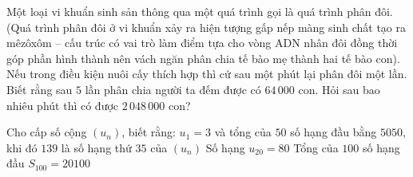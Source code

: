 \begin{ex}%
    Một loại vi khuẩn sinh sản thông qua một quá trình gọi là quá trình phân đôi. (Quá trình phân đôi ở vi khuẩn xảy ra hiện tượng gấp nếp màng sinh chất tạo ra mêzôxôm – cấu trúc có vai trò làm điểm tựa cho vòng ADN nhân đôi đồng thời góp phần hình thành nên vách ngăn phân chia tế bào mẹ thành hai tế bào con). Nếu trong điều kiện nuôi cấy thích hợp thì cứ sau một phút lại phân đôi một lần. Biết rằng sau $5$ lần phân chia người ta đếm được có $64\,000$ con. Hỏi sau bao nhiêu phút thì có được $2\,048\,000$ con?
\end{ex}

\begin{ex}%
	Cho cấp số cộng $\left(u_n\right)$, biết rằng: $u_1=3$ và tổng của $50$ số hạng đầu bằng $5050$, khi đó
	{\True $139$ là số hạng thứ $35$ của $\left(u_n\right)$}
	{Số hạng $u_{20}=80$}
	{\True Tổng của $100$ số hạng đầu $S_{100}=20100$}
\end{ex}

